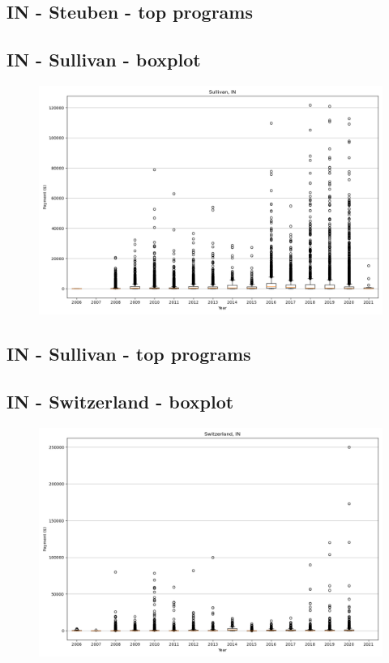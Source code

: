 \subsection*{IN - Steuben - top programs}

\newpage
\subsection*{IN - Sullivan - boxplot}
\begin{figure}[h]
\centering
\includegraphics[width=7in]{../output/boxplots/counties/Sullivan-IN_boxplot.png}
\end{figure}


\subsection*{IN - Sullivan - top programs}

\newpage
\subsection*{IN - Switzerland - boxplot}
\begin{figure}[h]
\centering
\includegraphics[width=7in]{../output/boxplots/counties/Switzerland-IN_boxplot.png}
\end{figure}


